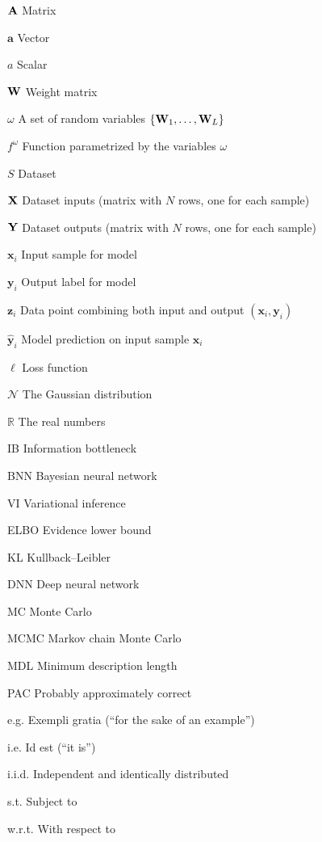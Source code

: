 
\begin{denotation}[3cm]
  \item[${\rm \mathbf{A}}$] Matrix
  \item[$\mathbf{a}$] Vector
  \item[$a$] Scalar
  \item[${\rm \mathbf{W}}$] Weight matrix
  \item[$\omega$] A set of random variables $\{{\rm \mathbf{W}}_1, \dots, {\rm \mathbf{W}}_L\}$
  \item[$f^\omega$] Function parametrized by the variables $\omega$
  \item[$S$] Dataset
  \item[${\rm \mathbf{X}}$] Dataset inputs (matrix with $N$ rows, one for each sample)
  \item[${\rm \mathbf{Y}}$] Dataset outputs (matrix with $N$ rows, one for each sample)
  \item[$\mathbf{x}_i$] Input sample for model
  \item[$\mathbf{y}_i$] Output label for model
  \item[$\mathbf{z}_i$] Data point combining both input and output $(\mathbf{x}_i,\mathbf{y}_i)$
  \item[$\hat{\mathbf{y}}_i$] Model prediction on input sample $\mathbf{x}_i$
  \item[$\ell$] Loss function
  \item[$\mathcal{N}$] The Gaussian distribution
  \item[$\mathbb{R}$] The real numbers
  \item[IB] Information bottleneck
  \item[BNN] Bayesian neural network
  \item[VI] Variational inference
  \item[ELBO] Evidence lower bound
  \item[KL] Kullback–Leibler
  \item[DNN] Deep neural network
  \item[MC] Monte Carlo
  \item[MCMC] Markov chain Monte Carlo
  \item[MDL] Minimum description length
  \item[PAC] Probably approximately correct 
  \item[e.g.] Exempli gratia (“for the sake of an example”)
  \item[i.e.] Id est (“it is”)
  \item[i.i.d.] Independent and identically distributed
  \item[s.t.] Subject to
  \item[w.r.t.] With respect to
\end{denotation}



